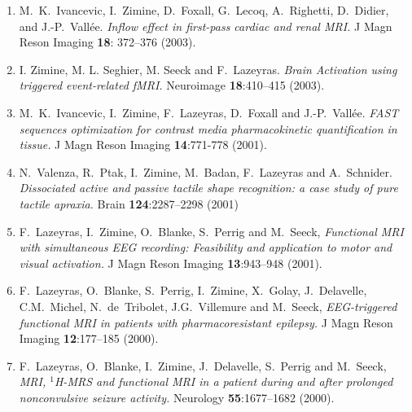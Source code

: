 \documentclass[a4paper,11pt,oneside]{article}
\begin{document}
\begin{enumerate}
\item M.~K.~Ivancevic, I.~Zimine, D.~Foxall, G.~Lecoq,
A.~Righetti, D.~Didier, and J.-P.~Vall\'{e}e.
\textit{Inflow effect in first-pass cardiac and renal MRI.}
J Magn Reson Imaging \textbf{18}: 372--376 (2003).

\item I. Zimine, M. L. Seghier, M. Seeck and F.~Lazeyras.
\textit{Brain Activation using triggered event-related fMRI.}
Neuroimage \textbf{18}:410--415 (2003).

\item M.~K.~Ivancevic, I.~Zimine, F.~Lazeyras, D.~Foxall and
J.-P.~Vall\'{e}e.
\textit{FAST sequences optimization for contrast media pharmacokinetic
quantification in tissue.} J Magn Reson Imaging
\textbf{14}:771-778 (2001).

\item N.~Valenza, R.~Ptak, I.~Zimine, M.~Badan, F.~Lazeyras and
A.~Schnider.
\textit{Dissociated active and passive tactile shape recognition:
a case study of pure tactile apraxia.} Brain \textbf{124}:2287--2298
(2001)

\item F.~Lazeyras, I.~Zimine, O.~Blanke, S.~Perrig and M.~Seeck,
\textit{Functional MRI with simultaneous EEG recording: Feasibility and
application to motor and visual activation.} J Magn Reson Imaging
\textbf{13}:943--948 (2001).

\item F.~Lazeyras, O.~Blanke, S.~Perrig, I.~Zimine, X.~Golay, J.~Delavelle,
C.M.~Michel, N.~de~Tribolet, J.G.~Villemure and M.~Seeck,
\textit{EEG-triggered functional MRI in patients with pharmacoresistant
epilepsy.} J Magn Reson Imaging \textbf{12}:177--185 (2000).

\item F.~Lazeyras, O.~Blanke, I.~Zimine, J.~Delavelle, S.~Perrig and M.~Seeck,
\textit{MRI, $^1$H-MRS and functional MRI in a patient during
and after prolonged nonconvulsive seizure activity.} Neurology
\textbf{55}:1677--1682 (2000).

\end{enumerate}

\end{document}
